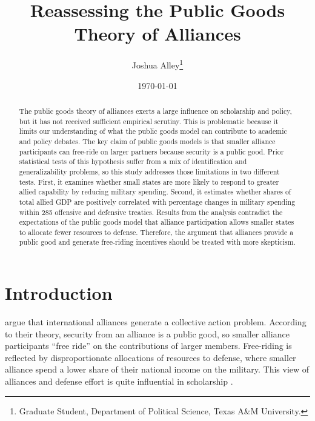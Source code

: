 \documentclass[12pt]{article}
\title{
\textbf{Reassessing the Public Goods Theory of Alliances}
	}
\author{Joshua Alley\footnote{Graduate Student,
Department of Political Science, Texas A\&M University.}}
\date{{\normalsize \today}}
\begin{document}
\maketitle 

\doublespace

\begin{abstract}
The public goods theory of alliances exerts a large influence on scholarship and policy, but it has not received sufficient empirical scrutiny. 
This is problematic because it limits our understanding of what the public goods model can contribute to academic and policy debates. 
The key claim of public goods models is that smaller alliance participants can free-ride on larger partners because security is a public good. 
Prior statistical tests of this hypothesis suffer from a mix of identification and generalizability problems, so this study addresses those limitations in two different tests. 
First, it examines whether small states are more likely to respond to greater allied capability by reducing military spending. 
Second, it estimates whether shares of total allied GDP are positively correlated with percentage changes in military spending within 285 offensive and defensive treaties. 
Results from the analysis contradict the expectations of the public goods model that alliance participation allows smaller states to allocate fewer resources to defense. 
Therefore, the argument that alliances provide a public good and generate free-riding incentives should be treated with more skepticism. 

\end{abstract} 

\newpage


\section{Introduction}



\citet{OlsonZeckhauser1966} argue that international alliances generate a collective action problem. 
According to their theory, security from an alliance is a public good, so smaller alliance participants ``free ride'' on the contributions of larger members. 
Free-riding is reflected by disproportionate allocations of resources to defense, where smaller alliance spend a lower share of their national income on the military.
This view of alliances and defense effort is quite influential in scholarship \citep{Walt1990, Mearsheimer1994, Goldstein1995, SandlerHartley2001, Garfinkel2004, Walt2009, Norrlof2010, Barrett2010, PluemperNeumayer2015}. 
\end{document}
